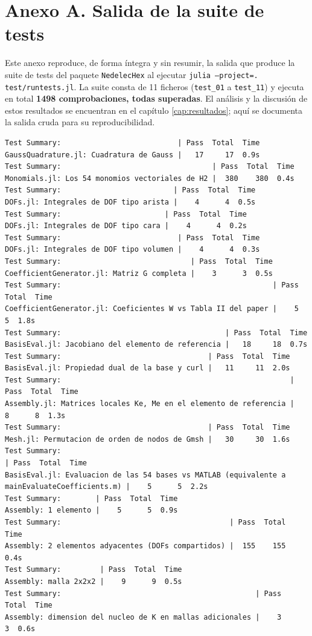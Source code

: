 \documentclass[12pt]{report} %
\begin{document}
\chapter*{Anexo A. Salida de la suite de tests}

Este anexo reproduce, de forma íntegra y sin resumir, la salida que produce la suite de tests del paquete \texttt{NedelecHex} al ejecutar \texttt{julia --project=. test/runtests.jl}. La suite consta de 11 ficheros (\texttt{test\_01} a \texttt{test\_11}) y ejecuta en total \textbf{1498 comprobaciones, todas superadas}. El análisis y la discusión de estos resultados se encuentran en el capítulo \ref{cap:resultados}; aquí se documenta la salida cruda para su reproducibilidad.

\begin{lstlisting}[numbers=none, captionpos=b, caption={Salida completa de la suite de tests.}, label=cod:salida-tests]
Test Summary:                           | Pass  Total  Time
GaussQuadrature.jl: Cuadratura de Gauss |   17     17  0.9s
Test Summary:                                   | Pass  Total  Time
Monomials.jl: Los 54 monomios vectoriales de H2 |  380    380  0.4s
Test Summary:                          | Pass  Total  Time
DOFs.jl: Integrales de DOF tipo arista |    4      4  0.5s
Test Summary:                        | Pass  Total  Time
DOFs.jl: Integrales de DOF tipo cara |    4      4  0.2s
Test Summary:                           | Pass  Total  Time
DOFs.jl: Integrales de DOF tipo volumen |    4      4  0.3s
Test Summary:                              | Pass  Total  Time
CoefficientGenerator.jl: Matriz G completa |    3      3  0.5s
Test Summary:                                                 | Pass  Total  Time
CoefficientGenerator.jl: Coeficientes W vs Tabla II del paper |    5      5  1.8s
Test Summary:                                      | Pass  Total  Time
BasisEval.jl: Jacobiano del elemento de referencia |   18     18  0.7s
Test Summary:                                  | Pass  Total  Time
BasisEval.jl: Propiedad dual de la base y curl |   11     11  2.0s
Test Summary:                                                     | Pass  Total  Time
Assembly.jl: Matrices locales Ke, Me en el elemento de referencia |    8      8  1.3s
Test Summary:                                  | Pass  Total  Time
Mesh.jl: Permutacion de orden de nodos de Gmsh |   30     30  1.6s
Test Summary:                                                                                 | Pass  Total  Time
BasisEval.jl: Evaluacion de las 54 bases vs MATLAB (equivalente a mainEvaluateCoefficients.m) |    5      5  2.2s
Test Summary:        | Pass  Total  Time
Assembly: 1 elemento |    5      5  0.9s
Test Summary:                                       | Pass  Total  Time
Assembly: 2 elementos adyacentes (DOFs compartidos) |  155    155  0.4s
Test Summary:         | Pass  Total  Time
Assembly: malla 2x2x2 |    9      9  0.5s
Test Summary:                                             | Pass  Total  Time
Assembly: dimension del nucleo de K en mallas adicionales |    3      3  0.6s


\end{lstlisting}
\end{document}
